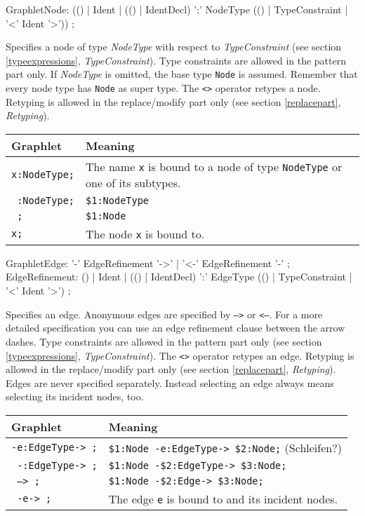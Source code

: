 \begin{rail}
GraphletNode: (() |
    Ident | 
    (() | IdentDecl) ':' NodeType (() | TypeConstraint | '<' Ident '>')) ;   
\end{rail}
Specifies a node of type \emph{NodeType} with respect to \emph{TypeConstraint} (see section \ref{typeexpressions}, \emph{TypeConstraint}). Type constraints are allowed in the pattern part only. If \emph{NodeType} is omitted, the base type \texttt{Node} is assumed. Remember that every node type has \texttt{Node} as super type. The \texttt{<>} operator retypes a node. Retyping is allowed in the replace/modify part only (see section \ref{replacepart}, \emph{Retyping}).
\begin{center}
  \begin{tabular}[c]{ll}
    \textbf{Graphlet} & \textbf{Meaning}\\ \hline
    \texttt{x:NodeType;} & The name \texttt{x} is bound to a node of type \texttt{NodeType} or one of its subtypes. \\
    \texttt{ :NodeType;} & \texttt{\$1:NodeType} \\
    \texttt{ ;} & \texttt{\$1:Node} \\
    \texttt{x;} & The node \texttt{x} is bound to.
  \end{tabular}
\end{center} 

\begin{rail}
  GraphletEdge: '-' EdgeRefinement '->'  | '<-' EdgeRefinement '-' ;
  EdgeRefinement: () | Ident | (() | IdentDecl) ':' EdgeType (() | TypeConstraint | '<' Ident '>') ;
\end{rail}
Specifies an edge. Anonymous edges are specified by \texttt{-->} or \texttt{<--}. For a more detailed specification you can use an edge refinement clause between the arrow dashes. Type constraints are allowed in the pattern part only (see section \ref{typeexpressions}, \emph{TypeConstraint}). The \texttt{<>} operator retypes an edge. Retyping is allowed in the replace/modify part only (see section \ref{replacepart}, \emph{Retyping}).\\
Edges are never specified separately. Instead selecting an edge always means selecting its incident nodes, too.
\begin{center}
  \begin{tabular}[c]{ll}
    \textbf{Graphlet} & \textbf{Meaning}\\ \hline
    \texttt{-e:EdgeType-> ;} & \texttt{\$1:Node -e:EdgeType-> \$2:Node;} (Schleifen?)  \\
    \texttt{ -:EdgeType-> ;} & \texttt{\$1:Node -\$2:EdgeType-> \$3:Node;} \\
    \texttt{ --> ;} & \texttt{\$1:Node -\$2:Edge-> \$3:Node;} \\
    \texttt{ -e-> ;} & The edge \texttt{e} is bound to and its incident nodes.
  \end{tabular}
\end{center} 

